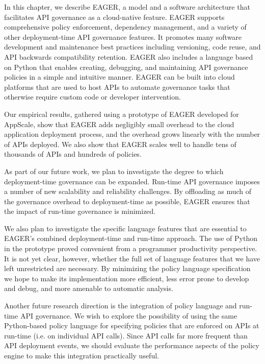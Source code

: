 In this chapter, we describe EAGER, a model and a software architecture that 
facilitates API governance as a cloud-native feature. EAGER supports comprehensive policy
enforcement, dependency management, and a variety of other deployment-time API
governance features. It promotes many software development and maintenance
best practices including versioning, code reuse, and API backwards
compatibility retention. EAGER also includes a language based on Python that enables
creating, debugging, and maintaining API governance policies in a simple and intuitive
manner. EAGER can be built into cloud platforms that are used to host APIs
to automate governance tasks that otherwise require custom code or developer intervention.

Our empirical results, gathered using a prototype of EAGER developed for AppScale,
show that EAGER adds negligibly small overhead to the cloud application 
deployment process, and the overhead grows linearly
with the number of APIs deployed. We also show that EAGER scales well 
to handle tens of thousands of APIs and hundreds of policies. 


As part of our future work, we plan to investigate the degree to which
deployment-time governance can be expanded.
Run-time API governance imposes a number of new scalability and
reliability challenges.  By offloading as much of the governance overhead to
deployment-time as possible, EAGER ensures that the impact of run-time
governance is minimized.  

We also plan to investigate the specific language features that are essential
to EAGER's combined deployment-time and run-time approach.  The use of Python
in the prototype proved convenient from a programmer productivity perspective.
It is not yet clear, however, whether the full set of language features that
we have left unrestricted are necessary.  By minimizing the policy language
specification we hope to make its implementation more efficient, less
error prone to develop and debug, and more amenable to automatic analysis.

Another future research direction is the integration of policy language and
run-time API governance.
We wish to explore the possibility of using the same Python-based
policy language for
specifying policies that are enforced on APIs at run-time (i.e. on individual
API calls). Since API calls
far more frequent than API deployment events, we should evaluate
the performance aspects of the policy engine to make this integration practically useful.

